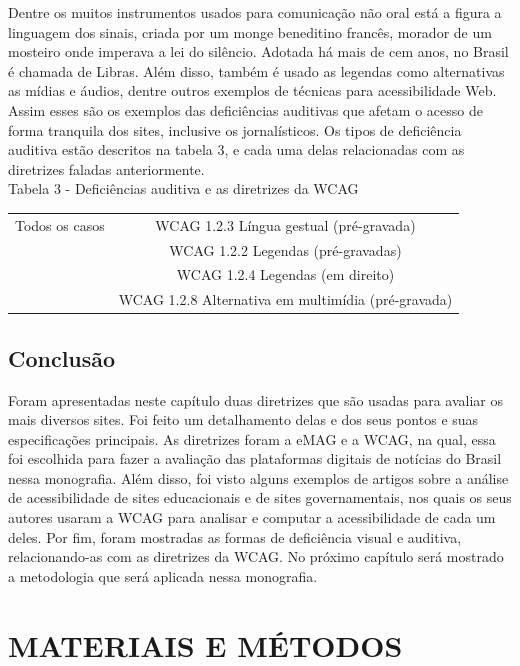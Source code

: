 \documentclass[a4paper]{article}
\begin{document}
\begin{titlepage}
Dentre os muitos instrumentos usados para comunicação não oral está a figura a linguagem dos sinais, criada por um monge beneditino francês, morador de um mosteiro onde imperava a lei do silêncio. Adotada há mais de cem anos, no Brasil é chamada de Libras. Além disso, também é usado as legendas como alternativas as mídias e áudios, dentre outros exemplos de técnicas para acessibilidade Web. Assim esses são os exemplos das deficiências auditivas que afetam o acesso de forma tranquila dos sites, inclusive os jornalísticos. Os tipos de deficiência auditiva estão descritos na tabela 3, e cada uma delas relacionadas com as diretrizes faladas anteriormente.\\

Tabela 3 - Deficiências auditiva e as diretrizes da WCAG\\[-1cm]
\begin{center}
	\begin{longtable}{|c|c|}
		\hline
		Todos os casos & WCAG 1.2.3 Língua gestual (pré-gravada)\\
		& WCAG 1.2.2 Legendas (pré-gravadas)\\ 
		& WCAG 1.2.4 Legendas (em direito)\\
		& WCAG 1.2.8 Alternativa em multimídia (pré-gravada)\\
		\hline
	\end{longtable}
\end{center}

\subsection{Conclusão}

Foram apresentadas neste capítulo duas diretrizes que são usadas para avaliar os mais diversos sites. Foi feito um detalhamento delas e dos seus pontos e suas especificações principais. As diretrizes foram a eMAG e a WCAG, na qual, essa foi escolhida para fazer a avaliação das plataformas digitais de notícias do Brasil nessa monografia. Além disso, foi visto alguns exemplos de artigos sobre a análise de acessibilidade de sites educacionais e de sites governamentais, nos quais os seus autores usaram a WCAG para analisar e computar a acessibilidade de cada um deles. Por fim, foram mostradas as formas de deficiência visual e auditiva, relacionando-as com as diretrizes da WCAG. No próximo capítulo será mostrado a metodologia que será aplicada nessa monografia.\\[16cm]

\section{MATERIAIS E MÉTODOS}


\end{titlepage}
\end{document}
